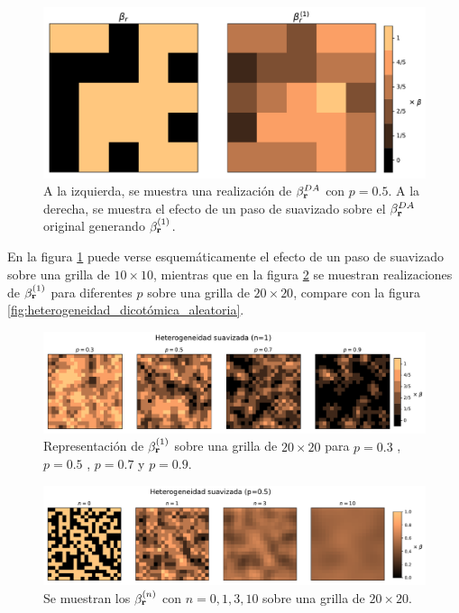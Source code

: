 \begin{figure}[t]
  \centering
  \includegraphics[width=.6\textwidth]{smoth_step.pdf}
  \caption{A la izquierda, se muestra una realización de $\beta_{\vb r}^{DA}$ con $p=0.5$. A la derecha, se muestra el efecto de un paso de suavizado 
  sobre el $\beta_{\vb r}^{DA}$ original generando $\beta_{\vb r}^{(1)}$.}
  \label{fig:smoth_step}
\end{figure}

En la figura \ref{fig:smoth_step} puede verse esquemáticamente el efecto de un paso de suavizado sobre una grilla de $10\times10$, mientras que 
en la figura \ref{fig:smoth} se muestran realizaciones de $\beta^{(1)}_{\vb r}$ para diferentes $p$ sobre una grilla de $20\times20$, compare con 
la figura \ref{fig:heterogeneidad_dicotómica_aleatoria}.

\begin{figure}[!b]
  \centering
  \includegraphics[width=.9\textwidth]{het_suav.pdf}
  \caption{Representación de $\beta^{(1)}_{\vb r}$ sobre una grilla de $20 \times 20$ para  $p=0.3$ , $p=0.5$ , $p=0.7$ y $p=0.9$.}
  \label{fig:smoth}
\end{figure}
\begin{figure}[!b]
  \centering
  \includegraphics[width=.9\textwidth]{nsmoth_step.pdf}
  \caption{Se muestran los $\beta^{(n)}_{\vb r}$ con $n=0,1,3,10$ sobre una grilla de $20\times20$.}
  \label{fig:nsmoth_step}
\end{figure}

